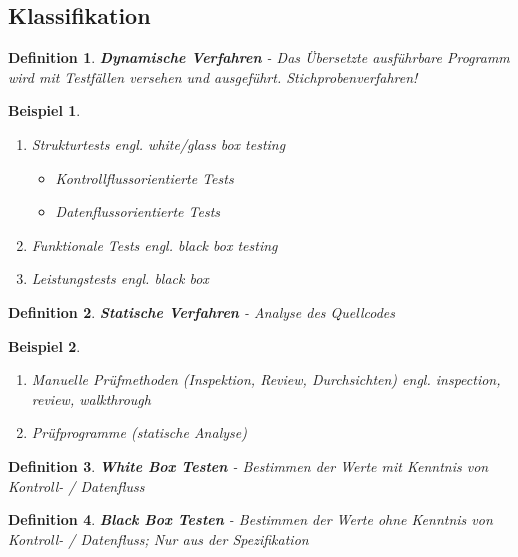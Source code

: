 \documentclass[a4paper]{article}
\theoremstyle{break}
\newtheorem{defi}{Definition}[section]
\newtheorem{ex}{Beispiel}[section]
\begin{document}
        \subsection{Klassifikation}
        \begin{defi}
          \textbf{Dynamische Verfahren} - Das Übersetzte ausführbare Programm wird mit Testfällen versehen und ausgeführt. Stichprobenverfahren!
        \end{defi}
        \begin {ex}
          \begin{enumerate}
          \item Strukturtests \textit{engl. white/glass box testing}
            \begin{itemize}
            \item Kontrollflussorientierte Tests
            \item Datenflussorientierte Tests
            \end{itemize}
          \item Funktionale Tests \textit{engl. black box testing}
          \item Leistungstests \textit{engl. black box}
          \end {enumerate}
        \end{ex}

        \begin{defi}
          \textbf{Statische Verfahren} - Analyse des Quellcodes
        \end{defi}
        \begin{ex}
          \begin {enumerate}
          \item Manuelle Prüfmethoden (Inspektion, Review, Durchsichten) \textit{engl. inspection, review, walkthrough}
          \item Prüfprogramme (statische Analyse)
          \end{enumerate}
        \end{ex}

        \begin{defi}
          \textbf{White Box Testen} - Bestimmen der Werte mit Kenntnis von Kontroll- / Datenfluss
        \end{defi}

        \begin{defi}
          \textbf{Black Box Testen} - Bestimmen der Werte ohne Kenntnis von Kontroll- / Datenfluss; Nur aus der Spezifikation
        \end{defi}
        
\end{document}
